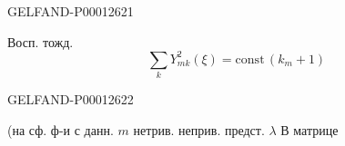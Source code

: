 \begin{GelfandAdjacentEvidence}{GELFAND-P000126}{21}

Восп. тожд.
\begin{equation*}\sum_kY_{mk}^2(\xi)=\mathrm{const}\,(k_m+1)\end{equation*}
\end{GelfandAdjacentEvidence}
\begin{GelfandAdjacentEvidence}{GELFAND-P000126}{22}

(на сф. ф-и с данн. $m$ нетрив. неприв. предст. $\lambda$ В матрице
\end{GelfandAdjacentEvidence}



